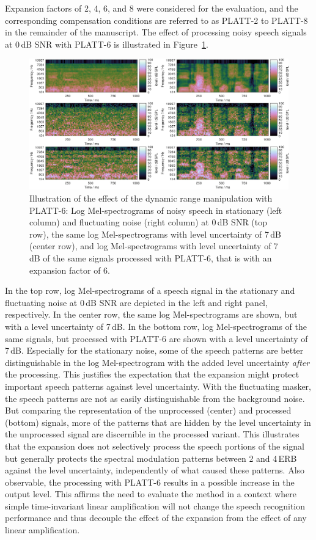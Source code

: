 \documentclass[10pt,a4paper,twocolumn]{article}
\begin{document}
Expansion factors of 2, 4, 6, and 8 were considered for the evaluation, and the corresponding compensation conditions are referred to as PLATT-2 to PLATT-8 in the remainder of the manuscript.
%
The effect of processing noisy speech signals at 0\,dB SNR with PLATT-6 is illustrated in Figure~\ref{fig:10}.
%
\begin{figure}[h]
	\centerline{\includegraphics[width=1\textwidth]{images/signal-processed}}
	\caption{Illustration of the effect of the dynamic range manipulation with PLATT-6: Log Mel-spectrograms of noisy speech in stationary (left column) and fluctuating noise (right column) at 0\,dB SNR (top row), the same log Mel-spectrograms with level uncertainty of 7\,dB (center row), and log Mel-spectrograms with level uncertainty of 7\,dB of the same signals processed with PLATT-6, that is with an expansion factor of 6.}
	\label{fig:10}
\end{figure}
%
In the top row, log Mel-spectrograms of a speech signal in the stationary and fluctuating noise at 0\,dB SNR are depicted in the left and right panel, respectively.
%
In the center row, the same log Mel-spectrograms are shown, but with a level uncertainty of 7\,dB.
%
In the bottom row, log Mel-spectrograms of the same signals, but processed with PLATT-6 are shown with a level uncertainty of 7\,dB.
%
Especially for the stationary noise, some of the speech patterns are better distinguishable in the log Mel-spectrogram with the added level uncertainty \emph{after} the processing.
%
This justifies the expectation that the expansion might protect important speech patterns against level uncertainty.
%
With the fluctuating masker, the speech patterns are not as easily distinguishable from the background noise.
%
But comparing the representation of the unprocessed (center) and processed (bottom) signals, more of the patterns that are hidden by the level uncertainty in the unprocessed signal are discernible in the processed variant.
%
This illustrates that the expansion does not selectively process the speech portions of the signal but generally protects the spectral modulation patterns between 2 and 4\,ERB against the level uncertainty, independently of what caused these patterns.
%
Also observable, the processing with PLATT-6 results in a possible increase in the output level.
%
This affirms the need to evaluate the method in a context where simple time-invariant linear amplification will not change the speech recognition performance and thus decouple the effect of the expansion from the effect of any linear amplification.
\end{document}
